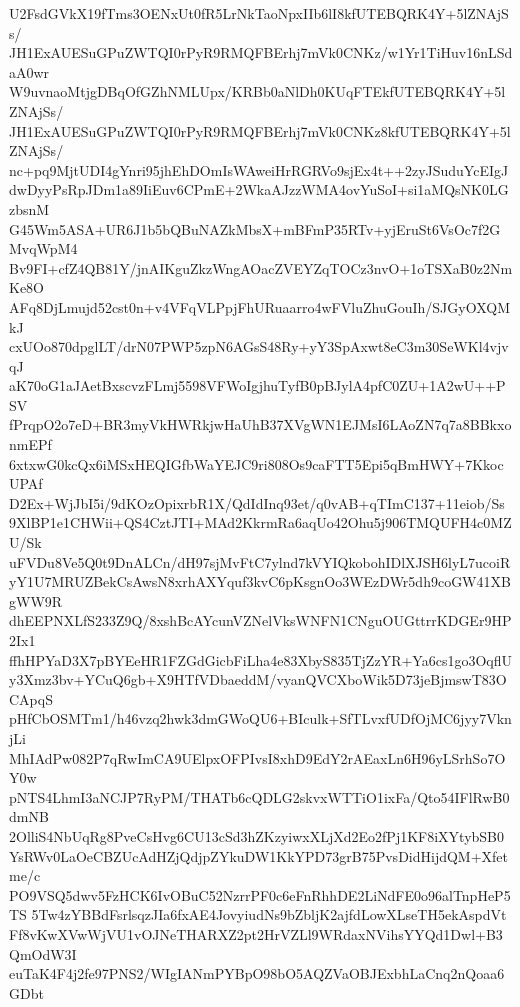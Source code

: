 U2FsdGVkX19fTms3OENxUt0fR5LrNkTaoNpxIIb6lI8kfUTEBQRK4Y+5lZNAjSs/
JH1ExAUESuGPuZWTQI0rPyR9RMQFBErhj7mVk0CNKz/w1Yr1TiHuv16nLSdaA0wr
W9uvnaoMtjgDBqOfGZhNMLUpx/KRBb0aNlDh0KUqFTEkfUTEBQRK4Y+5lZNAjSs/
JH1ExAUESuGPuZWTQI0rPyR9RMQFBErhj7mVk0CNKz8kfUTEBQRK4Y+5lZNAjSs/
nc+pq9MjtUDI4gYnri95jhEhDOmIsWAweiHrRGRVo9sjEx4t++2zyJSuduYcEIgJ
dwDyyPsRpJDm1a89IiEuv6CPmE+2WkaAJzzWMA4ovYuSoI+si1aMQsNK0LGzbsnM
G45Wm5ASA+UR6J1b5bQBuNAZkMbsX+mBFmP35RTv+yjEruSt6VsOc7f2GMvqWpM4
Bv9FI+cfZ4QB81Y/jnAIKguZkzWngAOacZVEYZqTOCz3nvO+1oTSXaB0z2NmKe8O
AFq8DjLmujd52cst0n+v4VFqVLPpjFhURuaarro4wFVluZhuGouIh/SJGyOXQMkJ
cxUOo870dpglLT/drN07PWP5zpN6AGsS48Ry+yY3SpAxwt8eC3m30SeWKl4vjvqJ
aK70oG1aJAetBxscvzFLmj5598VFWoIgjhuTyfB0pBJylA4pfC0ZU+1A2wU++PSV
fPrqpO2o7eD+BR3myVkHWRkjwHaUhB37XVgWN1EJMsI6LAoZN7q7a8BBkxonmEPf
6xtxwG0kcQx6iMSxHEQIGfbWaYEJC9ri808Os9caFTT5Epi5qBmHWY+7KkocUPAf
D2Ex+WjJbI5i/9dKOzOpixrbR1X/QdIdInq93et/q0vAB+qTImC137+11eiob/Ss
9XlBP1e1CHWii+QS4CztJTI+MAd2KkrmRa6aqUo42Ohu5j906TMQUFH4c0MZU/Sk
uFVDu8Ve5Q0t9DnALCn/dH97sjMvFtC7ylnd7kVYIQkobohIDlXJSH6lyL7ucoiR
yY1U7MRUZBekCsAwsN8xrhAXYquf3kvC6pKsgnOo3WEzDWr5dh9coGW41XBgWW9R
dhEEPNXLfS233Z9Q/8xshBcAYcunVZNelVksWNFN1CNguOUGttrrKDGEr9HP2Ix1
ffhHPYaD3X7pBYEeHR1FZGdGicbFiLha4e83XbyS835TjZzYR+Ya6cs1go3OqflU
y3Xmz3bv+YCuQ6gb+X9HTfVDbaeddM/vyanQVCXboWik5D73jeBjmswT83OCApqS
pHfCbOSMTm1/h46vzq2hwk3dmGWoQU6+BIculk+SfTLvxfUDfOjMC6jyy7VknjLi
MhIAdPw082P7qRwImCA9UElpxOFPIvsI8xhD9EdY2rAEaxLn6H96yLSrhSo7OY0w
pNTS4LhmI3aNCJP7RyPM/THATb6cQDLG2skvxWTTiO1ixFa/Qto54IFlRwB0dmNB
2OlliS4NbUqRg8PveCsHvg6CU13cSd3hZKzyiwxXLjXd2Eo2fPj1KF8iXYtybSB0
YsRWv0LaOeCBZUcAdHZjQdjpZYkuDW1KkYPD73grB75PvsDidHijdQM+Xfetme/c
PO9VSQ5dwv5FzHCK6IvOBuC52NzrrPF0c6eFnRhhDE2LiNdFE0o96alTnpHeP5TS
5Tw4zYBBdFsrlsqzJIa6fxAE4JovyiudNs9bZbljK2ajfdLowXLseTH5ekAspdVt
Ff8vKwXVwWjVU1vOJNeTHARXZ2pt2HrVZLl9WRdaxNVihsYYQd1Dwl+B3QmOdW3I
euTaK4F4j2fe97PNS2/WIgIANmPYBpO98bO5AQZVaOBJExbhLaCnq2nQoaa6GDbt
